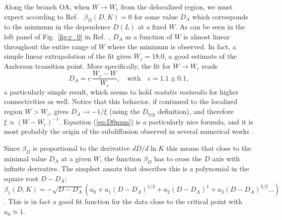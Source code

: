 \documentclass[reprint,aps,prl,superscriptaddress,english,nolongbibliography]{revtex4-2}
\begin{document}
{Along the branch OA, when $W\to W_c$ from the delocalized region, we must expect according to Ref.~\cite{Altshuler2016Nonergodic} $\beta_D(D,K) = 0$ for some value $D_A$ which corresponds to the minimum in the dependence $D(L)$ at a fixed $W$.
As can be seen in  the left panel of Fig.~\ref{fig:r_0} in Ref.~\cite{SupplMat}, $D_A$ as a function of $W$ is almost linear throughout the entire range of $W$ where the minimum is observed. In fact, a simple linear extrapolation of the fit gives $W_c=18.0$, a good estimate of the Anderson transition point. More specifically, the fit for $W\to W_c$ reads
\begin{equation}
    D_A=c \, \frac{W_c-W}{W_c}, \quad\mathrm{with}\quad c=1.1\pm 0.1,
    \label{eq:D0num}
\end{equation}
a particularly simple result, which seems to hold {\it mutatis mutandis} for higher connectivities as well. 
Notice that this behavior, if continued to the localized region $W>W_c$, gives $D_A\to -1/\xi$ (using the $D_{\mathrm{typ}}$ definition), and therefore $\xi\propto (W-W_c)^{-1}$.
Equation (\ref{eq:D0num}) is a particularly nice formula, and it is most probably the origin of the subdiffusion observed in several numerical works \cite{bera2018return,de2020subdiffusion}. 

Since $\beta_D$ is proportional to the derivative $dD/d\ln K$ this means that close to the minimal value $D_A$ at a given $W$, the function $\beta_D$ has to cross the $D$ axis with infinite derivative. The simplest ansatz that describes this is a polynomial in the square root $D-D_A$: $\beta_1(D,K)= -\sqrt{D-D_A}(a_0+a_1(D-D_A)^{1/2}+a_2(D-D_A)^{1}+a_3(D-D_A)^{3/2}...)$. This is in fact a good fit function for the data close to the critical point with $a_0\simeq 1$.

}
\end{document}
